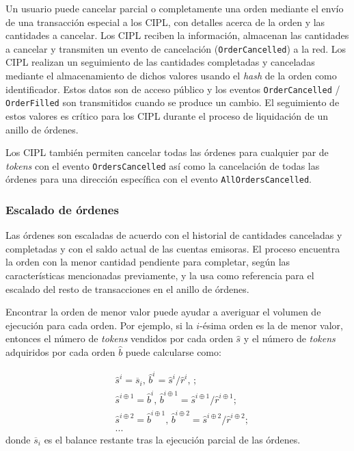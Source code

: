 \documentclass[UTF8,nofonts]{article}
\begin{document}
\begin{multicols}{2}
Un usuario puede cancelar parcial o completamente una orden mediante el envío de una transacción especial a los CIPL, con detalles acerca de la orden y las cantidades a cancelar. Los CIPL reciben la información, almacenan las cantidades a cancelar y transmiten un evento de cancelación (\verb|OrderCancelled|) a la red. Los CIPL realizan un seguimiento de las cantidades completadas y canceladas mediante el almacenamiento de dichos valores usando el \textit{hash} de la orden como identificador. Estos datos son de acceso público y los eventos \verb|OrderCancelled| / \verb|OrderFilled| son transmitidos cuando se produce un cambio. El seguimiento de estos valores es crítico para los CIPL durante el proceso de liquidación de un anillo de órdenes.

Los CIPL también permiten cancelar todas las órdenes para cualquier par de \textit{tokens} con el evento \verb|OrdersCancelled| así como la cancelación de todas las órdenes para una dirección específica con el evento \verb|AllOrdersCancelled|.


\subsubsection{Escalado de órdenes\label{sec:order_scaling}}
Las órdenes son escaladas de acuerdo con el historial de cantidades canceladas y completadas y con el saldo actual de las cuentas emisoras. El proceso encuentra la orden con la menor cantidad pendiente para completar, según las características mencionadas previamente, y la usa como referencia para el escalado del resto de transacciones en el anillo de órdenes.


Encontrar la orden de menor valor puede ayudar a averiguar el volumen de ejecución para cada orden. Por ejemplo, si la $i$-ésima orden es la de menor valor, entonces el número de \textit{tokens} vendidos por cada orden $\hat{s}$ y el número de \textit{tokens} adquiridos por cada orden $\hat{b}$ puede calcularse como:

\[
\begin{split}
&\hat{s}^{i}=\overline{s}_i\text{, } \hat{b}^{i}=\hat{s}^{i}/ \hat{r}^i\text{, }\text{;}\\
&\hat{s}^{i\oplus 1}=\hat{b}^i\text{, } \hat{b}^{i\oplus 1}=\hat{s}^{i\oplus 1}/ \hat{r}^{i\oplus 1}\text{;}\\
&\hat{s}^{i\oplus 2}=\hat{b}^{i\oplus 1}\text{, } \hat{b}^{i\oplus 2}=\hat{s}^{i\oplus 2}/ \hat{r}^{i\oplus 2}\text{;}\\
& ...
\end{split}
\]
donde $\overline{s}_i$ es el balance restante tras la ejecución parcial de las órdenes.


\end{multicols}
\end{document}
